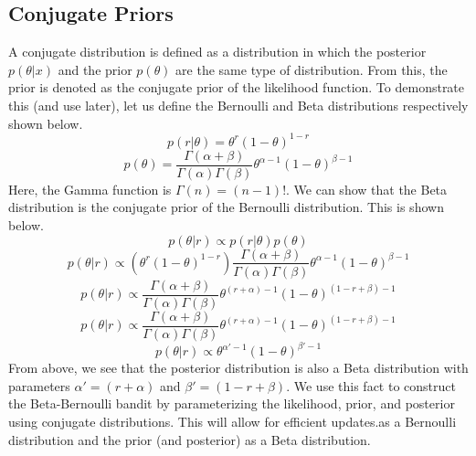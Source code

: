 \documentclass[11pt]{article}
\begin{document}
\subsection{Conjugate Priors}
A conjugate distribution is defined as a distribution in which the posterior $p(\theta | x)$ and the prior $p(\theta)$ are the same type of distribution. From this, the prior is denoted as the conjugate prior of the likelihood function. To demonstrate this (and use later), let us define the Bernoulli and Beta distributions respectively shown below.
\[ p(r|\theta) = \theta^r(1-\theta)^{1-r} \]
\[ p(\theta) = \frac{\Gamma(\alpha + \beta)}{\Gamma(\alpha)\Gamma(\beta)}\theta^{\alpha-1}(1-\theta)^{\beta-1} \]
Here, the Gamma function is $\Gamma(n) = (n-1)!$. We can show that the Beta distribution is the conjugate prior of the Bernoulli distribution. This is shown below.
\[ p(\theta|r) \propto p(r|\theta)p(\theta) \]
\[ p(\theta|r) \propto (\theta^r(1-\theta)^{1-r})\frac{\Gamma(\alpha + \beta)}{\Gamma(\alpha)\Gamma(\beta)}\theta^{\alpha-1}(1-\theta)^{\beta-1} \]
\[ p(\theta|r) \propto \frac{\Gamma(\alpha + \beta)}{\Gamma(\alpha)\Gamma(\beta)}\theta^{(r+\alpha)-1}(1-\theta)^{(1-r+\beta)-1} \]
\[ p(\theta|r) \propto \frac{\Gamma(\alpha + \beta)}{\Gamma(\alpha)\Gamma(\beta)}\theta^{(r+\alpha)-1}(1-\theta)^{(1-r+\beta)-1} \]
\[ p(\theta|r) \propto \theta^{\alpha'-1}(1-\theta)^{\beta'-1} \]
From above, we see that the posterior distribution is also a Beta distribution with parameters $\alpha' = (r+\alpha)$ and $\beta' = (1-r+\beta)$. We use this fact to construct the Beta-Bernoulli bandit by parameterizing the likelihood, prior, and posterior using conjugate distributions. This will allow for efficient updates.as a Bernoulli distribution and the prior (and posterior) as a Beta distribution.
\end{document}
